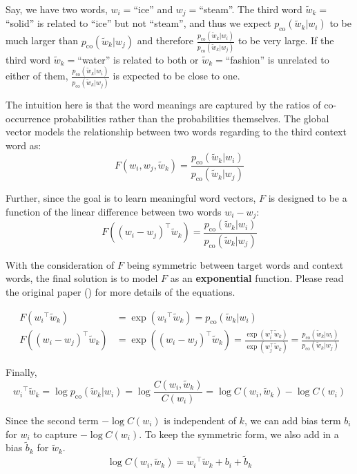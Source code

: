 Say, we have two words, $w_i=$``ice'' and $w_j=$``steam''. The third word $\tilde{w}_k=$``solid'' is related to ``ice'' but not ``steam'', and thus we expect $p_{\text{co}}(\tilde{w}_k \vert w_i)$ to be much larger than $p_{\text{co}}(\tilde{w}_k \vert w_j)$ and therefore $\frac{p_{\text{co}}(\tilde{w}_k \vert w_i)}{p_{\text{co}}(\tilde{w}_k \vert w_j)}$ to be very large. If the third word $\tilde{w}_k = $``water'' is related to both or $\tilde{w}_k = $``fashion'' is unrelated to either of them, $\frac{p_{\text{co}}(\tilde{w}_k \vert w_i)}{p_{\text{co}}(\tilde{w}_k \vert w_j)}$ is expected to be close to one.

The intuition here is that the word meanings are captured by the ratios of co-occurrence probabilities rather than the probabilities themselves. The global vector models the relationship between two words regarding to the third context word as:
\[
F(w_i, w_j, \tilde{w}_k) = \frac{p_{\text{co}}(\tilde{w}_k \vert w_i)}{p_{\text{co}}(\tilde{w}_k \vert w_j)}
\]

Further, since the goal is to learn meaningful word vectors, $F$ is designed to be a function of the linear difference between two words $w_i - w_j$:
\[
F((w_i - w_j)^\top \tilde{w}_k) = \frac{p_{\text{co}}(\tilde{w}_k \vert w_i)}{p_{\text{co}}(\tilde{w}_k \vert w_j)}
\]

With the consideration of $F$ being symmetric between target words and context words, the final solution is to model $F$ as an \textbf{exponential} function. Please read the original paper (\cite{pennington2014glove}) for more details of the equations.

\begin{align*}
F({w_i}^\top \tilde{w}_k) &= \exp({w_i}^\top \tilde{w}_k) = p_{\text{co}}(\tilde{w}_k \vert w_i) \\
F((w_i - w_j)^\top \tilde{w}_k) &= \exp((w_i - w_j)^\top \tilde{w}_k) = \frac{\exp(w_i^\top \tilde{w}_k)}{\exp(w_j^\top \tilde{w}_k)} = \frac{p_{\text{co}}(\tilde{w}_k \vert w_i)}{p_{\text{co}}(\tilde{w}_k \vert w_j)}
\end{align*}


Finally,
\[
{w_i}^\top \tilde{w}_k = \log p_{\text{co}}(\tilde{w}_k \vert w_i) = \log \frac{C(w_i, \tilde{w}_k)}{C(w_i)} = \log C(w_i, \tilde{w}_k) - \log C(w_i)
\]

Since the second term $-\log C(w_i)$ is independent of $k$, we can add bias term $b_i$ for $w_i$ to capture $-\log C(w_i)$. To keep the symmetric form, we also add in a bias $\tilde{b}_k$ for $\tilde{w}_k$.
\[
\log C(w_i, \tilde{w}_k) = {w_i}^\top \tilde{w}_k + b_i + \tilde{b}_k
\]

